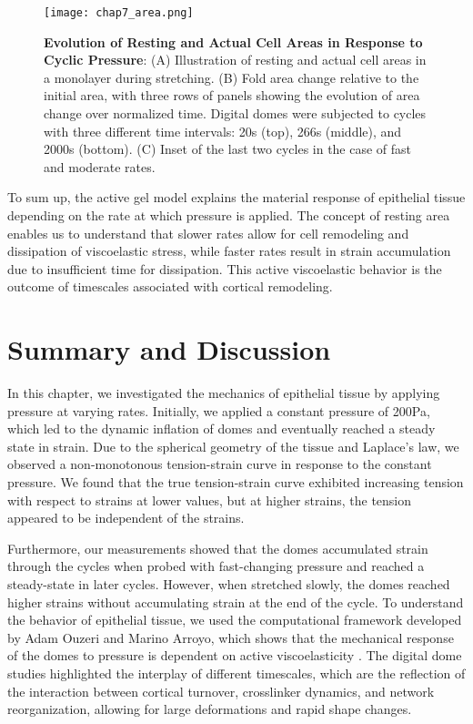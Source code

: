 \begin{figure}
	\centering
	\texttt{[image: chap7\_area.png]}
	\caption{\label{fig_7_8} \textbf{Evolution of Resting and Actual Cell Areas in Response to Cyclic Pressure}: (A) Illustration of resting and actual cell areas in a monolayer during stretching. (B) Fold area change relative to the initial area, with three rows of panels showing the evolution of area change over normalized time. Digital domes were subjected to cycles with three different time intervals: 20s (top), 266s (middle), and 2000s (bottom). (C) Inset of the last two cycles in the case of fast and moderate rates.
	}
\end{figure}

To sum up, the active gel model explains the material response of epithelial tissue depending on the rate at which pressure is applied. The concept of resting area enables us to understand that slower rates allow for cell remodeling and dissipation of viscoelastic stress, while faster rates result in strain accumulation due to insufficient time for dissipation. This active viscoelastic behavior is the outcome of timescales associated with cortical remodeling.

\clearpage
\hypertarget{summary}{%
	\section{Summary and Discussion}\label{summary}}

In this chapter, we investigated the mechanics of epithelial tissue by applying pressure at varying rates. Initially, we applied a constant pressure of 200Pa, which led to the dynamic inflation of domes and eventually reached a steady state in strain. Due to the spherical geometry of the tissue and Laplace’s law, we observed a non-monotonous tension-strain curve in response to the constant pressure. We found that the true tension-strain curve exhibited increasing tension with respect to strains at lower values, but at higher strains, the tension appeared to be independent of the strains. 

Furthermore, our measurements showed that the domes accumulated strain through the cycles when probed with fast-changing pressure and reached a steady-state in later cycles. However, when stretched slowly, the domes reached higher strains without accumulating strain at the end of the cycle. To understand the behavior of epithelial tissue, we used the computational framework developed by Adam Ouzeri and Marino Arroyo, which shows that the mechanical response of the domes to pressure is dependent on active viscoelasticity \cite{ouzeri2023}. The digital dome studies highlighted the interplay of different timescales, which are the reflection of the interaction between cortical turnover, crosslinker dynamics, and network reorganization, allowing for large deformations and rapid shape changes. 

